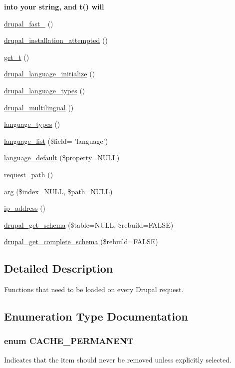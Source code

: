 \begin{Indent}{\bf into your string, and t() will}
\begin{DoxyCompactItemize}
\item 
\hyperlink{bootstrap_8inc_a1b7e5fe865e978d10be87d3eb57e42f7}{drupal\_\-fast\_} ()
\item 
\hyperlink{bootstrap_8inc_ac9902394c447118612c3a71191151f2c}{drupal\_\-installation\_\-attempted} ()
\item 
\hyperlink{group__sanitization_gaa50232f577883a48731fc93530628a79}{get\_\-t} ()
\item 
\hyperlink{bootstrap_8inc_a8abdce8019511ce4a74d3d9b48a93717}{drupal\_\-language\_\-initialize} ()
\item 
\hyperlink{bootstrap_8inc_a663476297a1e5f0b01dd2e063757392a}{drupal\_\-language\_\-types} ()
\item 
\hyperlink{bootstrap_8inc_ae1a2f0f465079ac3f1767b8c14553582}{drupal\_\-multilingual} ()
\item 
\hyperlink{bootstrap_8inc_ad541772a6e26f013b31257ee589979d5}{language\_\-types} ()
\item 
\hyperlink{bootstrap_8inc_aec69f67dd1921a3b55d7f9de9034ecb4}{language\_\-list} (\$field= 'language')
\item 
\hyperlink{bootstrap_8inc_a336c0878074791056c62640cd95d8067}{language\_\-default} (\$property=NULL)
\item 
\hyperlink{bootstrap_8inc_a58aae06c8c4282de3a6e292353bac1c0}{request\_\-path} ()
\item 
\hyperlink{bootstrap_8inc_afd40bf1dc5dc1f68fb326a8f6e0b88da}{arg} (\$index=NULL, \$path=NULL)
\item 
\hyperlink{bootstrap_8inc_aec2f772317b4fb79cc696412c2e455c3}{ip\_\-address} ()
\item 
\hyperlink{group__schemaapi_ga979670bd6bd2e34337ffc5f0810f2d71}{drupal\_\-get\_\-schema} (\$table=NULL, \$rebuild=FALSE)
\item 
\hyperlink{group__schemaapi_ga31cee7d4c13fafc15c69304f16e34686}{drupal\_\-get\_\-complete\_\-schema} (\$rebuild=FALSE)
\end{DoxyCompactItemize}
\end{Indent}


\subsection{Detailed Description}
Functions that need to be loaded on every Drupal request. 

\subsection{Enumeration Type Documentation}
\hypertarget{bootstrap_8inc_ad987330fff5fa7c75800762ddedf300c}{
\subsubsection[{CACHE\_\-PERMANENT}]{\setlength{\rightskip}{0pt plus 5cm}enum {\bf CACHE\_\-PERMANENT}}}
\label{bootstrap_8inc_ad987330fff5fa7c75800762ddedf300c}
Indicates that the item should never be removed unless explicitly selected.

